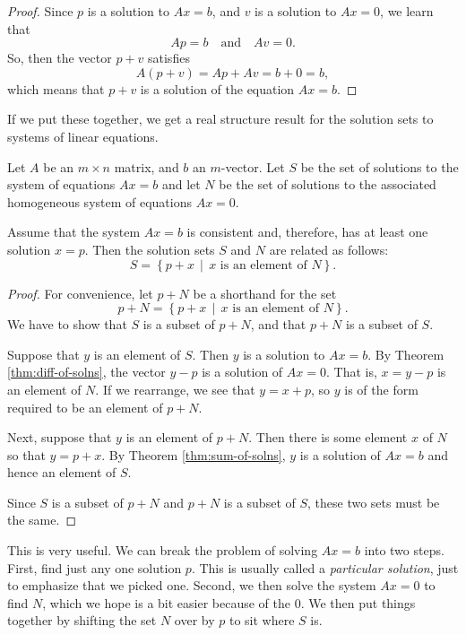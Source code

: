 \documentclass[00-livre-main.tex]{subfiles}
\begin{document}
\begin{proof}
Since $p$ is a solution to $Ax=b$, and $v$ is a solution to $Ax=0$, we learn that
\[
Ap=b \quad \text{and} \quad Av=0.
\]
So, then the vector $p+v$ satisfies
\[
A(p+v) = Ap + Av = b + 0 = b,
\]
which means that $p+v$ is a solution of the equation $Ax=b$.
\end{proof}

If we put these together, we get a real structure result for the solution sets to systems of linear equations.

\begin{theorem}
Let $A$ be an $m\times n$ matrix, and $b$ an $m$-vector. Let $S$ be the set of solutions to the system of equations $Ax=b$ and let $N$ be the set of solutions to the associated homogeneous system of equations $Ax=0$. 

Assume that the system $Ax=b$ is consistent and, therefore, has at least one solution $x=p$. Then the solution sets $S$ and $N$ are related as follows:
\[
S = \left\{ p+x \, \middle|\, \text{$x$ is an element of $N$} \right\}.
\]
\end{theorem}

\begin{proof}
For convenience, let $p+N$ be a shorthand for the set
\[
p+N = \left\{ p+x \, \middle|\, \text{$x$ is an element of $N$} \right\}.
\]
We have to show that $S$ is a subset of $p+N$, and that $p+N$ is a subset of $S$.

Suppose that $y$ is an element of $S$. Then $y$ is a solution to $Ax=b$. By Theorem \ref{thm:diff-of-solns}, the vector $y-p$ is a solution of $Ax=0$. That is, $x = y-p$ is an element of $N$. If we rearrange, we see that $y=x+p$, so $y$ is of the form required to be an element of $p+N$.

Next, suppose that $y$ is an element of $p+N$. Then there is some element $x$ of $N$ so that $y=p+x$. By Theorem \ref{thm:sum-of-solns}, $y$ is a solution of $Ax=b$ and hence an element of $S$. 

Since $S$ is a subset of $p+N$ and $p+N$ is a subset of $S$, these two sets must be the same.
\end{proof}

This is very useful. We can break the problem of solving $Ax=b$ into two steps. First, find just any one solution $p$. This is usually called a \emph{particular solution}, just to emphasize that we picked one. Second, we then solve the system $Ax=0$ to find $N$, which we hope is a bit easier because of the $0$. We then put things together by shifting 
the set $N$ over by $p$ to sit where $S$ is.
\end{document}

